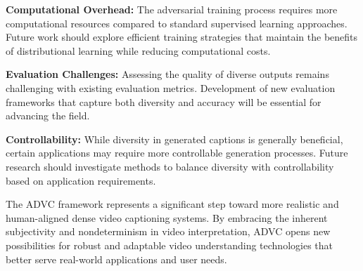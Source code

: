 \textbf{Computational Overhead:} The adversarial training process requires more computational resources compared to standard supervised learning approaches. Future work should explore efficient training strategies that maintain the benefits of distributional learning while reducing computational costs.

\textbf{Evaluation Challenges:} Assessing the quality of diverse outputs remains challenging with existing evaluation metrics. Development of new evaluation frameworks that capture both diversity and accuracy will be essential for advancing the field.

\textbf{Controllability:} While diversity in generated captions is generally beneficial, certain applications may require more controllable generation processes. Future research should investigate methods to balance diversity with controllability based on application requirements.

The ADVC framework represents a significant step toward more realistic and human-aligned dense video captioning systems. By embracing the inherent subjectivity and nondeterminism in video interpretation, ADVC opens new possibilities for robust and adaptable video understanding technologies that better serve real-world applications and user needs.